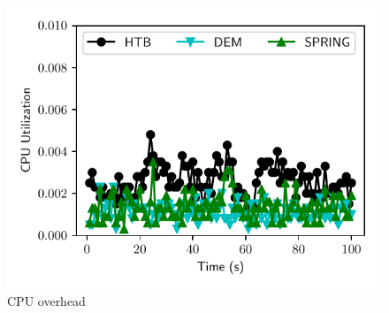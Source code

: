 \begin{figure}[!t]
\centering
\includegraphics[width=\columnwidth]{../raw_data/cpu_overhead/figure.pdf}
\caption{CPU overhead}
\label{fig:cpu-overhead}
\end{figure}
